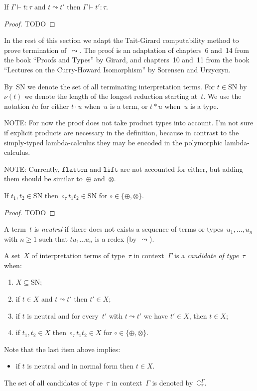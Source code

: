 \documentclass[runningheads,a4paper]{llncs}
\newcommand{\app}[2]{#1 \cdot #2}
\newcommand{\tapp}[2]{#1 * #2}
\newcommand{\flatten}{\mathtt{flatten}}
\newcommand{\lift}{\mathtt{lift}}
\newcommand{\SN}{\mathrm{SN}}
\newcommand{\Cb}{\mathbb{C}}
\begin{document}
\begin{lemma}
  If $\Gamma \vdash t : \tau$ and $t \leadsto t'$ then
  $\Gamma \vdash t' : \tau$.
\end{lemma}

\begin{proof}
  TODO
\end{proof}

In the rest of this section we adapt the Tait-Girard computability
method to prove termination of~$\leadsto$. The proof is an adaptation
of chapters~6 and~14 from the book ``Proofs and Types'' by Girard, and
chapters~10 and~11 from the book ``Lectures on the Curry-Howard
Isomorphism'' by Sorensen and Urzyczyn.

By~$\SN$ we denote the set of all terminating interpretation
terms. For $t \in \SN$ by~$\nu(t)$ we denote the length of the longest
reduction starting at~$t$. We use the notation $t u$ for either
$\app{t}{u}$ when~$u$ is a term, or $\tapp{t}{u}$ when~$u$ is a type.

NOTE: For now the proof does not take product types into account. I'm
not sure if explicit products are necessary in the definition, because
in contrast to the simply-typed lambda-calculus they may be encoded in
the polymorphic lambda-calculus.

NOTE: Currently, $\flatten$ and $\lift$ are not accounted for either,
but adding them should be similar to~$\oplus$ and~$\otimes$.

\begin{lemma}\label{lem_circ_sn}
  If $t_1,t_2 \in \SN$ then $\circ_\tau t_1 t_2 \in \SN$ for
  $\circ \in \{\oplus,\otimes\}$.
\end{lemma}

\begin{proof}
  TODO
\end{proof}

\begin{definition}\label{def_candidate}
  A term~$t$ is \emph{neutral} if there does not exists a sequence of
  terms or types~$u_1,\ldots,u_n$ with $n \ge 1$ such that
  $t u_1 \ldots u_n$ is a redex (by~$\leadsto$).

  A set~$X$ of interpretation terms of type~$\tau$ in context~$\Gamma$
  is a \emph{candidate of type~$\tau$} when:
  \begin{enumerate}
  \item $X \subseteq \SN$;
  \item if $t \in X$ and $t \leadsto t'$ then $t' \in X$;
  \item if $t$ is neutral and for every~$t'$ with $t \leadsto t'$ we
    have $t' \in X$, then $t \in X$;
  \item if $t_1,t_2 \in X$ then $\circ_\tau t_1 t_2 \in X$ for $\circ
    \in \{\oplus,\otimes\}$.
  \end{enumerate}
  Note that the last item above implies:
  \begin{itemize}
  \item if $t$ is neutral and in normal form then $t \in X$.
  \end{itemize}
  The set of all candidates of type~$\tau$ in context~$\Gamma$ is
  denoted by~$\Cb_\tau^\Gamma$.
\end{definition}
\end{document}

